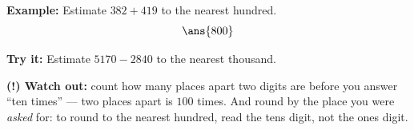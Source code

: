\documentclass[12pt]{article}
\begin{document}
\begin{examplebox}
\textbf{Example:} Estimate $382 + 419$ to the nearest hundred.
\[ \ans{800} \]
\end{examplebox}

\begin{tryitbox}
\textbf{Try it:} Estimate $5170 - 2840$ to the nearest thousand.\\[2pt]
\end{tryitbox}

\begin{watchoutbox}
\textbf{(!) Watch out:} count how many places apart two digits are before you
answer ``ten times'' --- two places apart is $100$ times. And round by the place
you were \emph{asked} for: to round to the nearest hundred, read the tens digit,
not the ones digit.
\end{watchoutbox}
\end{document}
